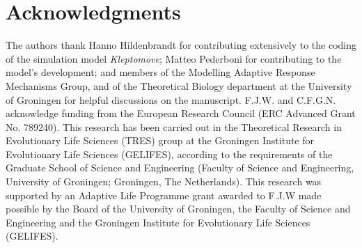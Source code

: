 \documentclass[11pt]{article}
\begin{document}

\section{Acknowledgments}

The authors thank Hanno Hildenbrandt for contributing extensively to the coding of the simulation model \textit{Kleptomove};
Matteo Pederboni for contributing to the model's development; 
and members of the Modelling Adaptive Response Mechanisms Group, and of the Theoretical Biology department at the University of Groningen for helpful discussions on the manuscript.
F.J.W. and C.F.G.N. acknowledge funding from the European Research Council (ERC Advanced Grant No. 789240).
This research has been carried out in the Theoretical Research in Evolutionary Life Sciences (TRES) group at the Groningen Institute for Evolutionary Life Sciences (GELIFES), according to the requirements of the Graduate School of Science and Engineering (Faculty of Science and Engineering, University of Groningen; Groningen, The  Netherlands).
This research was supported by an Adaptive Life Programme grant awarded to F.J.W made possible by the Board of the University of Groningen, the Faculty of Science and Engineering and the Groningen Institute for Evolutionary Life Sciences (GELIFES).




\newpage{}

\end{document}
